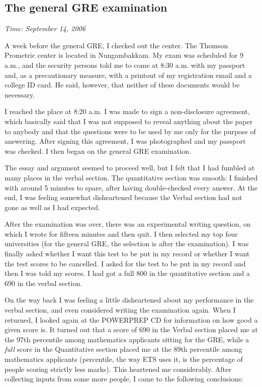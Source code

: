 \documentclass[a4paper]{amsart}
\begin{document}
\subsection{The general GRE examination}

{\em Time: September 14, 2006}

A week before the general GRE, I checked out the center. The Thomson
Prometric center is located in Nungambakkam. My exam was scheduled for
9 a.m., and the security persons told me to come at 8:30 a.m. with my
passport and, as a precautionary measure, with a printout of my
registration email and a college ID card. He said, however, that
neither of these documents would be necessary.

I reached the place at 8:20 a.m. I was made to sign a non-disclosure
agreement, which basically said that I was not supposed to reveal
anything about the paper to anybody and that the questions were to be
used by me only for the purpose of answering. After signing this
agreement, I was photographed and my passport was checked. I then
began on the general GRE examination.

The essay and argument seemed to proceed well, but I felt that I had
fumbled at many places in the verbal section. The quantitative section
was smooth: I finished with around 5 minutes to spare, after having
double-checked every answer. At the end, I was feeling somewhat disheartened
because the Verbal section had not gone as well as I had expected.

After the examination was over, there was an experimental writing
question, on which I wrote for fifteen minutes and then quit. I then
selected my top four universities (for the general GRE, the selection
is after the examination). I was finally asked whether I want
this test to be put in my record or whether I want the test scores
to be cancelled. I asked for the test to be put in my record and then
I was told my scores. I had got a full 800 in the quantitative section
and a 690 in the verbal section.

On the way back I was feeling a little disheartened about my performance
in the verbal section, and even considered writing the examination
again. When I returned, I looked again at the POWERPREP CD for
information on how good a given score is. It turned out that a score
of 690 in the Verbal section placed me at the 97th percentile among
mathematics applicants sitting for the GRE, while a {\em full} score
in the Quantitative section placed me at the 89th percentile among
mathematics applicants (percentile, the way ETS uses it, is the
percentage of people scoring strictly less marks). This heartened me
considerably. After collecting inputs from some more people, I came to
the following conclusions:
\end{document}
